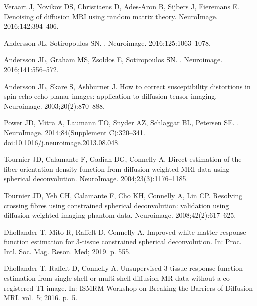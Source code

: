 \documentclass[10pt,letterpaper]{article}
\begin{document}
\begin{thebibliography}{100}
Veraart J, Novikov DS, Christiaens D, Ades-Aron B, Sijbers J, Fieremans E.
\newblock Denoising of diffusion {MRI} using random matrix theory.
\newblock NeuroImage. 2016;142:394--406.

Andersson JL, Sotiropoulos SN.
.
\newblock Neuroimage. 2016;125:1063--1078.

Andersson JL, Graham MS, Zsoldos E, Sotiropoulos SN.
.
\newblock Neuroimage. 2016;141:556--572.

Andersson JL, Skare S, Ashburner J.
\newblock How to correct susceptibility distortions in spin-echo echo-planar
  images: application to diffusion tensor imaging.
\newblock Neuroimage. 2003;20(2):870--888.

Power JD, Mitra A, Laumann TO, Snyder AZ, Schlaggar BL, Petersen SE.
.
\newblock NeuroImage. 2014;84(Supplement C):320--341.
\newblock doi:{10.1016/j.neuroimage.2013.08.048}.

Tournier JD, Calamante F, Gadian DG, Connelly A.
\newblock Direct estimation of the fiber orientation density function from
  diffusion-weighted {MRI} data using spherical deconvolution.
\newblock NeuroImage. 2004;23(3):1176--1185.

Tournier JD, Yeh CH, Calamante F, Cho KH, Connelly A, Lin CP.
\newblock Resolving crossing fibres using constrained spherical deconvolution:
  validation using diffusion-weighted imaging phantom data.
\newblock Neuroimage. 2008;42(2):617--625.

Dhollander T, Mito R, Raffelt D, Connelly A.
\newblock Improved white matter response function estimation for 3-tissue
  constrained spherical deconvolution.
\newblock In: Proc. Intl. Soc. Mag. Reson. Med; 2019. p. 555.

Dhollander T, Raffelt D, Connelly A.
\newblock Unsupervised 3-tissue response function estimation from single-shell
  or multi-shell diffusion {MR} data without a co-registered {T1} image.
\newblock In: ISMRM Workshop on Breaking the Barriers of Diffusion MRI. vol.~5;
  2016. p.~5.


\end{thebibliography}
\end{document}
